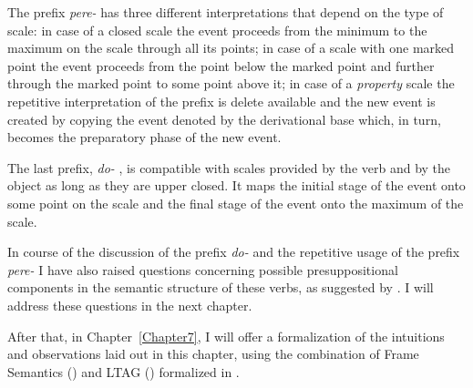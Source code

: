 The prefix \textit{pere-}   has three different interpretations that depend on the type of scale: in case of a closed scale the event proceeds from the minimum to the maximum on the scale through all its points; in case of a scale with one marked point the event proceeds from the point below the marked point and further through the marked point to some point above it; in case of a \textit{property} scale the repetitive  interpretation of the prefix is delete available and the new event is created by copying the event denoted by the derivational base which, in turn, becomes the preparatory phase of the new event. 

The last prefix, \textit{do-}  , is compatible with scales provided by the verb and by the object as long as they are upper closed. It maps the initial stage of the event onto some point on the scale and the final stage of the event onto the maximum of the scale. 

In course of the discussion of the prefix \textit{do-}   and the repetitive  usage of the prefix \textit{pere-}   I have also raised questions concerning possible presuppositional components in the semantic structure of these verbs, as suggested by \citet{Kagan:book}. I will address these questions in the next chapter.

After that, in Chapter~\ref{Chapter7}, I will offer a formalization of the intuitions and observations laid out in this chapter, using the combination of Frame Semantics (\citealt{Fillmore:82}) and LTAG (\citealt{JoshiSchabes:97}) formalized in \citealt{KallmeyerOsswald:13}. 


